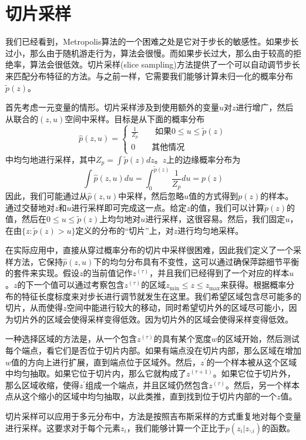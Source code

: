 \section{切片采样}
我们已经看到，Metropolis算法的一个困难之处是它对于步长的敏感性。如果步长过小，那么由于随机游走行为，算法会很慢。而如果步长过大，那么由于较高的拒绝率，算法会很低效。切片采样(slice sampling)方法提供了一个可以自动调节步长来匹配分布特征的方法。与之前一样，它需要我们能够计算未归一化的概率分布$\tilde{p}(z)$。

首先考虑一元变量的情形。切片采样涉及到使用额外的变量$u$对$z$进行增广，然后从联合的$(z,u)$空间中采样。目标是从下面的概率分布
\begin{equation}
	\hat{p}(z,u)=\begin{cases}
		\frac{1}{Z_p}\qquad \text{如果}0\leqslant u \leqslant \tilde{p}(z)\\
		0\qquad \text{其他情况}
	\end{cases}
\end{equation}
中均匀地进行采样，其中$Z_p=\int \tilde{p}(z)dz$。$z$上的边缘概率分布为
\begin{equation}
	\int \hat{p}(z,u)du=\int _0^{\tilde{p}(z)}\frac{1}{Z_p}du=p(z)
\end{equation}
因此，我们可能通过从$\hat{p}(z,u)$中采样，然后忽略$u$值的方式得到$p(z)$的样本。通过交替地对$z$和$u$进行采样即可完成这一点。给定$z$的值，我们可以计算$\tilde{p}(z)$的值，然后在$0\leqslant u \leqslant \tilde{p}(z)$上均匀地对$u$进行采样，这很容易。然后，我们固定$u$，在由$\{z:\tilde{p}(z)>u \}$定义的分布的“切片”上，对$z$进行均匀地采样。

在实际应用中，直接从穿过概率分布的切片中采样很困难，因此我们定义了一个采样方法，它保持$\hat{p}(z,u)$下的均匀分布具有不变性，这可以通过确保萍踪细节平衡的套件来实现。假设$z$的当前值记作$z^{(\tau)}$，并且我们已经得到了一个对应的样本$u$。$z$的下一个值可以通过考察包含$z^{(\tau)}$的区域$z_{\mathrm{min}}\leqslant z\leqslant z_{\mathrm{max}}$来获得。根据概率分布的特征长度标度来对步长进行调节就发生在这里。我们希望区域包含尽可能多的切片，从而使得$z$空间中能进行较大的移动，同时希望切片外的区域尽可能小，因为切片外的区域会使得采样变得低效。因为切片外的区域会使得采样变得低效。

一种选择区域的方法是，从一个包含$z^{(\tau)}$的具有某个宽度$w$的区域开始，然后测试每个端点，看它们是否位于切片内部。如果有端点没在切片内部，那么区域在增加$w$值的方向上进行扩展，直到端点位于区域外。然后，$z^{'}$的一个样本被从这个区域中均匀抽取。如果它位于切片内，那么它就构成了$z^{(\tau+1)}$。如果它位于切片外，那么区域收缩，使得$z^{'}$组成一个端点，并且区域仍然包含$z^{(\tau)}$。然后，另一个样本点从这个缩小的区域中均匀抽取，以此类推，直到找到位于切片内部的一个$z$值。

切片采样可以应用于多元分布中，方法是按照吉布斯采样的方式重复地对每个变量进行采样。这要求对于每个元素$z_i$，我们能够计算一个正比于$p(z_i|z_{\backslash i})$的函数。